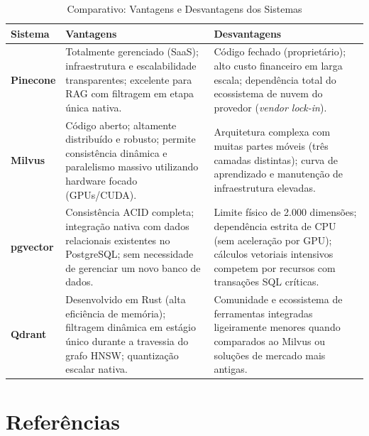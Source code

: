 \documentclass[a4paper, 12pt]{article} %
\begin{document}
\begin{table}[H]
\centering
\caption{Comparativo: Vantagens e Desvantagens dos Sistemas}
\label{tab:vantagens_desvantagens}
\small
\setlength{\extrarowheight}{4pt}
\begin{tabularx}{\textwidth}{l X X}
\toprule
\textbf{Sistema} & \textbf{Vantagens} & \textbf{Desvantagens} \\
\midrule
\textbf{Pinecone} & 
Totalmente gerenciado (SaaS); infraestrutura e escalabilidade transparentes; excelente para RAG com filtragem em etapa única nativa. & 
Código fechado (proprietário); alto custo financeiro em larga escala; dependência total do ecossistema de nuvem do provedor (\textit{vendor lock-in}). \\
\addlinespace \hline \addlinespace
\textbf{Milvus} & 
Código aberto; altamente distribuído e robusto; permite consistência dinâmica e paralelismo massivo utilizando hardware focado (GPUs/CUDA). & 
Arquitetura complexa com muitas partes móveis (três camadas distintas); curva de aprendizado e manutenção de infraestrutura elevadas. \\
\addlinespace \hline \addlinespace
\textbf{pgvector} & 
Consistência ACID completa; integração nativa com dados relacionais existentes no PostgreSQL; sem necessidade de gerenciar um novo banco de dados. & 
Limite físico de 2.000 dimensões; dependência estrita de CPU (sem aceleração por GPU); cálculos vetoriais intensivos competem por recursos com transações SQL críticas. \\
\addlinespace \hline \addlinespace
\textbf{Qdrant} & 
Desenvolvido em Rust (alta eficiência de memória); filtragem dinâmica em estágio único durante a travessia do grafo HNSW; quantização escalar nativa. & 
Comunidade e ecossistema de ferramentas integradas ligeiramente menores quando comparados ao Milvus ou soluções de mercado mais antigas. \\
\bottomrule
\end{tabularx}
\end{table}

\section{Referências}
\printbibliography
\end{document}
